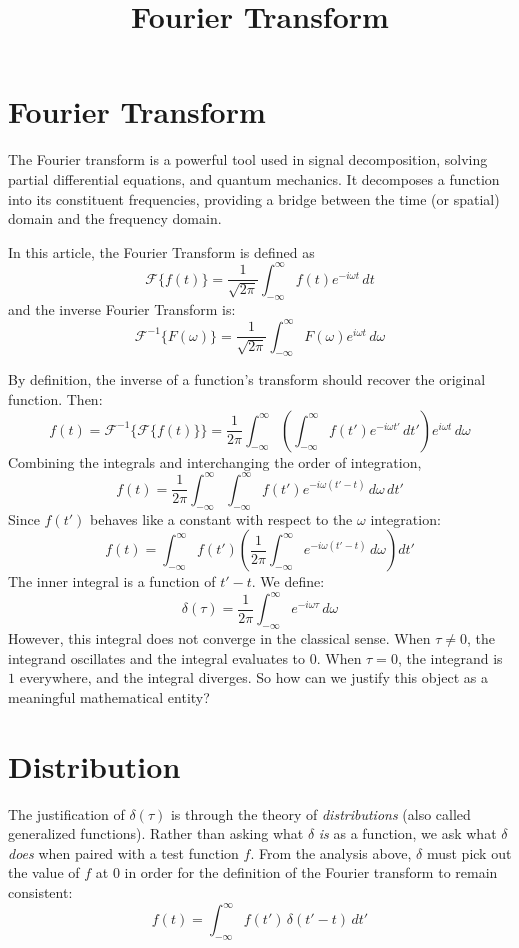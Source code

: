 \documentclass[]{article}
\title{Fourier Transform}
\author{}
\begin{document}
\maketitle

\section{Fourier Transform}

The Fourier transform is a powerful tool used in signal decomposition, solving partial differential equations, and quantum mechanics. It decomposes a function into its constituent frequencies, providing a bridge between the time (or spatial) domain and the frequency domain.

In this article, the Fourier Transform is defined as
\[\mathcal{F}\{f(t)\}  = \frac{1}{\sqrt{2\pi}}\int_{-\infty}^{\infty} f(t)e^{-i\omega t}\,dt\]
and the inverse Fourier Transform is:
\[\mathcal{F}^{-1}\{F(\omega)\}  = \frac{1}{\sqrt{2\pi}}\int_{-\infty}^{\infty} F(\omega)e^{i\omega t}\,d\omega\]

By definition, the inverse of a function's transform should recover the original function. Then:
\[f(t) = \mathcal{F}^{-1} \{\mathcal{F}\{f(t)\}\}  = \frac{1}{2\pi}\int_{-\infty}^{\infty} \left(\int_{-\infty}^{\infty}
f(t')e^{-i\omega t'}\,dt'\right)e ^{i\omega t}\,d\omega\]
Combining the integrals and interchanging the order of integration,
\[f(t)  =\frac{1}{2\pi} \int_{-\infty}^{\infty} \int_{-\infty}^{\infty}
f(t')e^{-i \omega(t'-t)}  \,d\omega\, dt' \]
Since $f(t')$ behaves like a constant with respect to the $\omega$ integration:
\[f(t)  = \int_{-\infty}^{\infty} f(t')\left(\frac{1}{2\pi}\int_{-\infty}^{\infty}
e^{-i \omega(t'-t)}  \,d\omega\right) dt' \]
The inner integral is a function of $t'-t$. We define:
\[\delta(\tau) = \frac{1}{2\pi}\int_{-\infty}^{\infty}
e^{-i \omega \tau}  \,d\omega\]
However, this integral does not converge in the classical sense. When $\tau \neq 0$, the integrand oscillates and the integral evaluates to $0$. When $\tau = 0$, the integrand is $1$ everywhere, and the integral diverges. So how can we justify this object as a meaningful mathematical entity?

\section{Distribution}

The justification of $\delta(\tau)$ is through the theory of \textit{distributions} (also called generalized functions). Rather than asking what $\delta$ \textit{is} as a function, we ask what $\delta$ \textit{does} when paired with a test function $f$. From the analysis above, $\delta$ must pick out the value of $f$ at $0$ in order for the definition of the Fourier transform to remain consistent:
\[f(t)  = \int_{-\infty}^{\infty} f(t') \,\delta(t'-t)\, dt' \]
\end{document}
